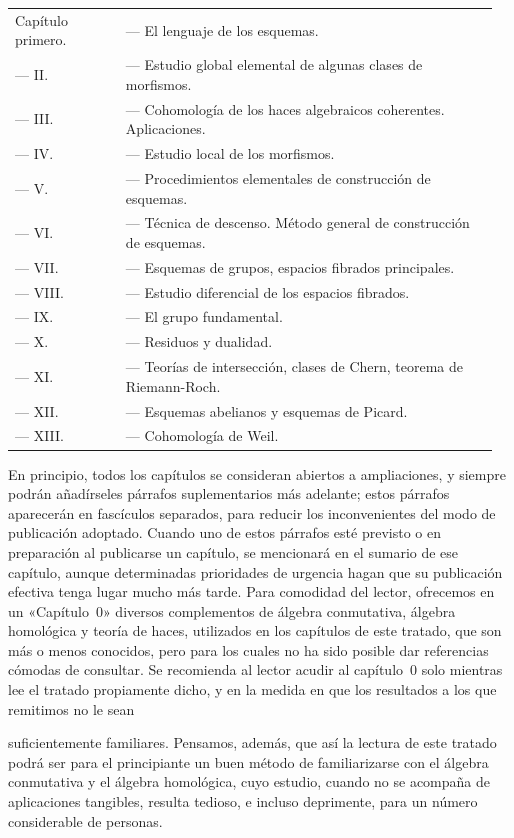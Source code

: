 \medskip
\begin{tabular}{@{}p{0.22\linewidth}p{0.74\linewidth}@{}}
  Capítulo primero. & --- El lenguaje de los esquemas.\\
  --- II. & --- Estudio global elemental de algunas clases de morfismos.\\
  --- III. & --- Cohomología de los haces algebraicos coherentes. Aplicaciones.\\
  --- IV. & --- Estudio local de los morfismos.\\
  --- V. & --- Procedimientos elementales de construcción de esquemas.\\
  --- VI. & --- Técnica de descenso. Método general de construcción de esquemas.\\
  --- VII. & --- Esquemas de grupos, espacios fibrados principales.\\
  --- VIII. & --- Estudio diferencial de los espacios fibrados.\\
  --- IX. & --- El grupo fundamental.\\
  --- X. & --- Residuos y dualidad.\\
  --- XI. & --- Teorías de intersección, clases de Chern, teorema de Riemann-Roch.\\
  --- XII. & --- Esquemas abelianos y esquemas de Picard.\\
  --- XIII. & --- Cohomología de Weil.\\
\end{tabular}
\medskip

En principio, todos los capítulos se consideran abiertos a ampliaciones, y siempre podrán añadírseles párrafos suplementarios más adelante; estos párrafos aparecerán en fascículos separados, para reducir los inconvenientes del modo de publicación adoptado.
Cuando uno de estos párrafos esté previsto o en preparación al publicarse un capítulo, se mencionará en el sumario de ese capítulo, aunque determinadas prioridades de urgencia hagan que su publicación efectiva tenga lugar mucho más tarde.
Para comodidad del lector, ofrecemos en un «Capítulo~0» diversos complementos de álgebra conmutativa, álgebra homológica y teoría de haces, utilizados en los capítulos de este tratado, que son más o menos conocidos, pero para los cuales no ha sido posible dar referencias cómodas de consultar.
Se recomienda al lector acudir al capítulo~0 solo mientras lee el tratado propiamente dicho, y en la medida en que los resultados a los que remitimos no le sean

suficientemente familiares.
Pensamos, además, que así la lectura de este tratado podrá ser para el principiante un buen método de familiarizarse con el álgebra conmutativa y el álgebra homológica, cuyo estudio, cuando no se acompaña de aplicaciones tangibles, resulta tedioso, e incluso deprimente, para un número considerable de personas.

